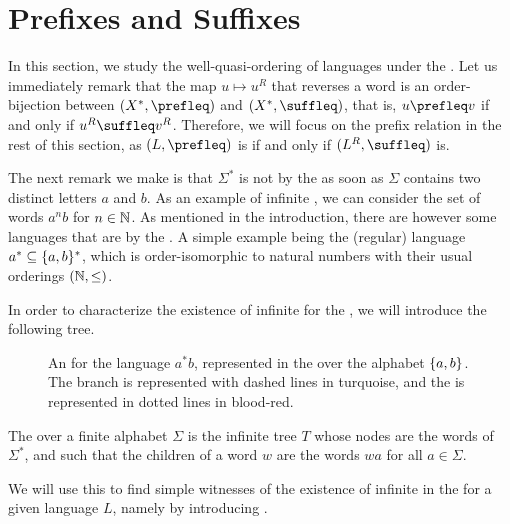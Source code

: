 \section{Prefixes and Suffixes}
\label{prefixes:sec}

In this section, we study the well-quasi-ordering of languages under the
. Let us immediately remark that the map $u \mapsto u^R$
that reverses a word is an order-bijection between $(X^*, \prefleq)$ and $(X^*,
\suffleq)$, that is, $u \prefleq v$ if and only if $u^R \suffleq v^R$.
Therefore, we will focus on the prefix relation in the rest of this section, as
$(L, \prefleq)$ is  if and only if $(L^R, \suffleq)$ is.

The next remark we make is that $\Sigma^*$ is not  by
the  as soon as $\Sigma$ contains two distinct letters $a$
and $b$. As an example of infinite , we can consider the set of
words $a^n b$ for $n \in \mathbb{N}$. As mentioned in the introduction, there are
however some languages  that are  by the . A simple example being the (regular) language $a^* \subseteq
\{ a,b \}^*$, which is order-isomorphic to natural numbers with their usual
orderings $(\mathbb{N}, \leq)$.

In order to characterize the existence of infinite  for the
, we will introduce the following tree.

\begin{figure}
    \centering
    
    \caption{An  for the language $a^* b$,
        represented in the  over the alphabet $\{ a,b \}$.
        The branch is represented with dashed lines in turquoise, and the
         is represented in dotted lines in blood-red.
    }
    \label{antichain-branch:fig}
\end{figure}

\begin{definition}
    The  over a finite alphabet $\Sigma$
    is the infinite tree $T$ whose nodes are the words of $\Sigma^*$, and
    such that the children of a word $w$ are the words $wa$ for all $a \in
    \Sigma$. 
\end{definition}

We will use this  to find simple witnesses
of the existence of infinite  in the 
for a given language $L$, namely by introducing .

